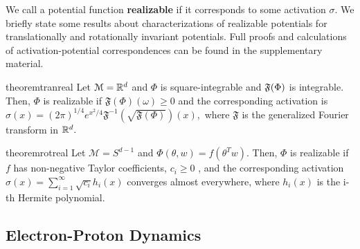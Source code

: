 We call a potential function {\bf realizable} if it corresponds to
some activation $\sigma$.  We briefly state some results about
characterizations of realizable potentials for translationally and
rotationally invariant potentials. Full proofs and calculations of
activation-potential correspondences
can be found in the supplementary material.
%
\begin{restatable}{theorem}{tranreal}
\label{thm:tranReal}
Let $\mathcal{M} = {\mathbb{R}}^d$ and $\Phi$ is square-integrable and ${\mathfrak{F}}(\Phi)$ is integrable. Then, $\Phi$ is realizable if $\mathfrak{F}(\Phi)(\omega) \geq 0$ and the corresponding activation is 
$\sigma(x) =
  (2\pi)^{1/4}e^{x^2/4}\mathfrak{F}^{-1}(\sqrt{\mathfrak{F}(\Phi)})(x), $
where $\mathfrak{F}$ is the generalized Fourier transform in ${\mathbb{R}}^d.$
\end{restatable}
%
\begin{restatable}{theorem}{rotreal}
\label{thm:rotReal}
Let $\mathcal{M} = S^{d-1}$ and $\Phi(\theta,w) = f(\theta^Tw)$. Then,
$\Phi$ is realizable if $f$ has non-negative Taylor coefficients, $c_i
\geq 0$ , and the corresponding activation $\sigma(x) = \sum_{i=1}^\infty \sqrt{c_i} h_i(x)$
converges almost everywhere, where $h_i(x)$ is the i-th Hermite polynomial.
\end{restatable}
%
\subsection{Electron-Proton Dynamics}

%
%

